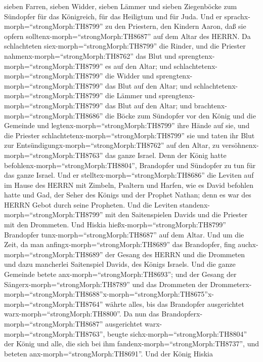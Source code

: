 sieben Farren, sieben Widder, sieben Lämmer und sieben Ziegenböcke zum
Sündopfer für das Königreich, für das Heiligtum und für Juda. Und er
sprachx-morph=``strongMorph:TH8799'' zu den Priestern, den Kindern
Aaron, daß sie opfern solltenx-morph=``strongMorph:TH8687'' auf dem
Altar des HERRN.  Da schlachteten
siex-morph=``strongMorph:TH8799'' die Rinder, und die Priester
nahmenx-morph=``strongMorph:TH8762'' das Blut und
sprengtenx-morph=``strongMorph:TH8799'' es auf den Altar; und
schlachtetenx-morph=``strongMorph:TH8799'' die Widder und
sprengtenx-morph=``strongMorph:TH8799'' das Blut auf den Altar; und
schlachtetenx-morph=``strongMorph:TH8799'' die Lämmer und
sprengtenx-morph=``strongMorph:TH8799'' das Blut auf den Altar;
 und brachtenx-morph=``strongMorph:TH8686'' die Böcke zum
Sündopfer vor den König und die Gemeinde und
legtenx-morph=``strongMorph:TH8799'' ihre Hände auf sie, 
und die Priester schlachtetenx-morph=``strongMorph:TH8799'' sie und
taten ihr Blut zur Entsündigungx-morph=``strongMorph:TH8762'' auf den
Altar, zu versöhnenx-morph=``strongMorph:TH8763'' das ganze Israel. Denn
der König hatte befohlenx-morph=``strongMorph:TH8804'', Brandopfer und
Sündopfer zu tun für das ganze Israel.  Und er
stelltex-morph=``strongMorph:TH8686'' die Leviten auf im Hause des HERRN
mit Zimbeln, Psaltern und Harfen, wie es David befohlen hatte und Gad,
der Seher des Königs und der Prophet Nathan; denn es war des HERRN Gebot
durch seine Propheten.  Und die Leviten
standenx-morph=``strongMorph:TH8799'' mit den Saitenspielen Davids und
die Priester mit den Drommeten.  Und Hiskia
hießx-morph=``strongMorph:TH8799'' Brandopfer
tunx-morph=``strongMorph:TH8687'' auf dem Altar. Und um die Zeit, da man
anfingx-morph=``strongMorph:TH8689'' das Brandopfer, fing
auchx-morph=``strongMorph:TH8689'' der Gesang des HERRN und die
Drommeten und dazu mancherlei Saitenspiel Davids, des Königs Israels.
 Und die ganze Gemeinde betete
anx-morph=``strongMorph:TH8693''; und der Gesang der
Sängerx-morph=``strongMorph:TH8789'' und das Drommeten der
Drommeterx-morph=``strongMorph:TH8688''\textbar x-morph=``strongMorph:TH8675''x-morph=``strongMorph:TH8764''
währte alles, bis das Brandopfer ausgerichtet
warx-morph=``strongMorph:TH8800''.  Da nun das
Brandopferx-morph=``strongMorph:TH8687'' ausgerichtet
warx-morph=``strongMorph:TH8763'', beugte
sichx-morph=``strongMorph:TH8804'' der König und alle, die sich bei ihm
fandenx-morph=``strongMorph:TH8737'', und beteten
anx-morph=``strongMorph:TH8691''.  Und der König Hiskia
